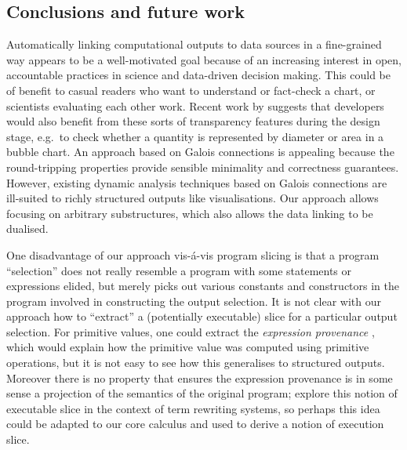 \subsection{Conclusions and future work}
\label{sec:conclusion:conclusions-and-future-work}

Automatically linking computational outputs to data sources in a fine-grained way appears to be a well-motivated goal because of an increasing interest in open, accountable practices in science and data-driven decision making. This could be of benefit to casual readers who want to understand or fact-check a chart, or scientists evaluating each other work. Recent work by \citet{walny19} suggests that developers would also benefit from these sorts of transparency features during the design stage, e.g.~to check whether a quantity is represented by diameter or area in a bubble chart. An approach based on Galois connections is appealing because the round-tripping properties provide sensible minimality and correctness guarantees. However, existing dynamic analysis techniques based on Galois connections are ill-suited to richly structured outputs like visualisations. Our approach allows focusing on arbitrary substructures, which also allows the data linking to be dualised.

One disadvantage of our approach vis-\'a-vis program slicing is that a program ``selection'' does not really resemble a program with some statements or expressions elided, but merely picks out various constants and constructors in the program involved in constructing the output selection. It is not clear with our approach how to ``extract'' a (potentially executable) slice for a particular output selection. For primitive values, one could extract the \emph{expression provenance} \cite{acar12}, which would explain how the primitive value was computed using primitive operations, but it is not easy to see how this generalises to structured outputs. Moreover there is no property that ensures the expression provenance is in some sense a projection of the semantics of the original program; \citet{field98} explore this notion of executable slice in the context of term rewriting systems, so perhaps this idea could be adapted to our core calculus and used to derive a notion of execution slice.
